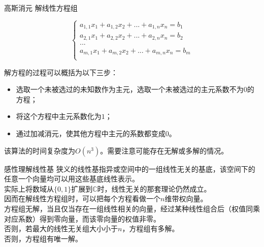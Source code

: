 \documentclass{beamer}
\begin{document}
	\begin{frame}{高斯消元}
		解线性方程组
		
		$$\begin{cases}
		a_{1,1}x_1+a_{1,2}x_2+...+a_{1,n}x_n=b_1\\
		a_{2,1}x_1+a_{2,2}x_2+...+a_{2,n}x_n=b_2\\
		...\\
		a_{m,1}x_1+a_{m,2}x_2+...+a_{m,n}x_n=b_m\\
		\end{cases}$$
		
		解方程的过程可以概括为以下三步：
		
		\begin{itemize}
			\item 选取一个未被选过的未知数作为主元，选取一个未被选过的主元系数不为$0$的方程；
			\item 将这个方程中主元系数化为$1$；
			\item 通过加减消元，使其他方程中主元的系数都变成$0$。
		\end{itemize}
		
		该算法的时间复杂度为$O(n^3)$。需要注意可能存在无解或多解的情况。

	\end{frame}
	\begin{frame}{感性理解线性基}
		狭义的线性基指异或空间中的一组线性无关的基底，该空间下的任意一个向量均可以用这些基底线性表示。\pause\\
		
		实际上将数域从$\{0,1\}$扩展到$\mathbb{C}$时，线性无关的那套理论仍然成立。\\
		
		因而在解线性方程组时，可以把每个方程看做一个$n$维带权向量。\pause\\
		
		方程组无解，当且仅当存在一组线性相关的向量，经过某种线性组合后（权值同乘对应系数）得到零向量，而该零向量的权值非零。\\
		
		否则，若最大的线性无关组大小小于$n$，方程组有多解。\\
		
		否则，方程组有唯一解。
	\end{frame}
\end{document}
